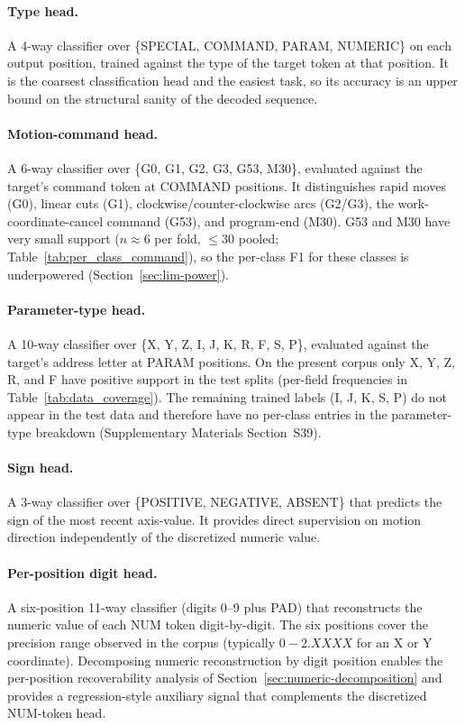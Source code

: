 \documentclass[sensors,article,submit,moreauthors,pdftex]{Definitions/mdpi}
\begin{document}
\paragraph{Type head.} A 4-way classifier over \{SPECIAL, COMMAND, PARAM, NUMERIC\} on each output position, trained against the type of the target token at that position. It is the coarsest classification head and the easiest task, so its accuracy is an upper bound on the structural sanity of the decoded sequence.

\paragraph{Motion-command head.} A 6-way classifier over \{G0, G1, G2, G3, G53, M30\}, evaluated against the target's command token at COMMAND positions. It distinguishes rapid moves (G0), linear cuts (G1), clockwise/counter-clockwise arcs (G2/G3), the work-coordinate-cancel command (G53), and program-end (M30). G53 and M30 have very small support ($n\!\approx\!6$ per fold, $\le\!30$ pooled; Table~\ref{tab:per_class_command}), so the per-class F1 for these classes is underpowered (Section~\ref{sec:lim-power}).

\paragraph{Parameter-type head.} A 10-way classifier over \{X, Y, Z, I, J, K, R, F, S, P\}, evaluated against the target's address letter at PARAM positions. On the present corpus only X, Y, Z, R, and F have positive support in the test splits (per-field frequencies in Table~\ref{tab:data_coverage}). The remaining trained labels (I, J, K, S, P) do not appear in the test data and therefore have no per-class entries in the parameter-type breakdown (Supplementary Materials Section~S39).

\paragraph{Sign head.} A 3-way classifier over \{POSITIVE, NEGATIVE, ABSENT\} that predicts the sign of the most recent axis-value. It provides direct supervision on motion direction independently of the discretized numeric value.

\paragraph{Per-position digit head.} A six-position 11-way classifier (digits 0--9 plus PAD) that reconstructs the numeric value of each NUM token digit-by-digit. The six positions cover the precision range observed in the corpus (typically $0\!-\!2\!.X\!X\!X\!X$ for an X or Y coordinate). Decomposing numeric reconstruction by digit position enables the per-position recoverability analysis of Section~\ref{sec:numeric-decomposition} and provides a regression-style auxiliary signal that complements the discretized NUM-token head.
\end{document}
